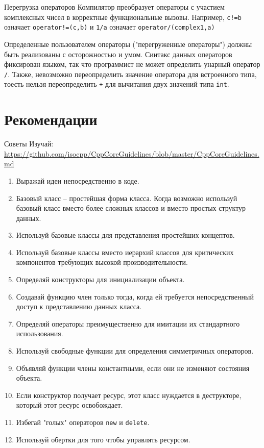 \documentclass[
    9pt,
    hyperref={pdfencoding=unicode}
    ]{beamer}
\theoremstyle{definition}
\begin{document}
\begin{frame}[fragile]{Перегрузка операторов}
    Компилятор преобразует операторы с участием комплексных чисел в корректные функциональные вызовы. Например, \texttt{c!=b} означает \texttt{operator!=(c,b)} и \texttt{1/a} означает \texttt{operator/(complex{1},a)}
    
    \vfill
    
    Определенные пользователем операторы ("перегруженные операторы") должны быть реализованы с осторожностью и умом. Синтакс данных операторов фиксирован языком, так что программист не может определить унарный оператор \texttt{/}. Также, невозможно переопределить значение оператора для встроенного типа, тоесть нельзя переопределить \texttt{+} для вычитания двух значений типа \texttt{int}.
    
\end{frame}

\section{Рекомендации}
\begin{frame}[t,allowframebreaks]{Советы}
    Изучай:    \href{https://github.com/isocpp/CppCoreGuidelines/blob/master/CppCoreGuidelines.md}{https://github.com/isocpp/CppCoreGuidelines/blob/master/CppCoreGuidelines.md}
    
    \begin{enumerate}
        \item Выражай идеи непосредственно в коде.
        \item Базовый класс -- простейшая форма класса. Когда возможно используй базовый класс вместо более сложных классов и вместо простых структур данных.
        \item Используй базовые классы для представления простейших концептов.
        \item Используй базовые классы вместо иерархий классов для критических компонентов требующих высокой производительности.
        \item Определяй конструкторы для инициализации объекта.
        \item Создавай функцию член только тогда, когда ей требуется непосредственный доступ к представлению данных класса.
        \item Определяй операторы преимущественно для имитации их стандартного использования.
        \item Используй свободные функции для определения симметричных операторов.
        \item Объявляй функции члены константными, если они не изменяют состояния объекта.
        \item Если конструктор получает ресурс, этот класс нуждается в деструкторе, который этот ресурс освобождает.
        \item Избегай "голых" операторов \texttt{new} и \texttt{delete}.
        \item Используй обертки для того чтобы управлять ресурсом.
    \end{enumerate}
\end{frame}
\end{document}
